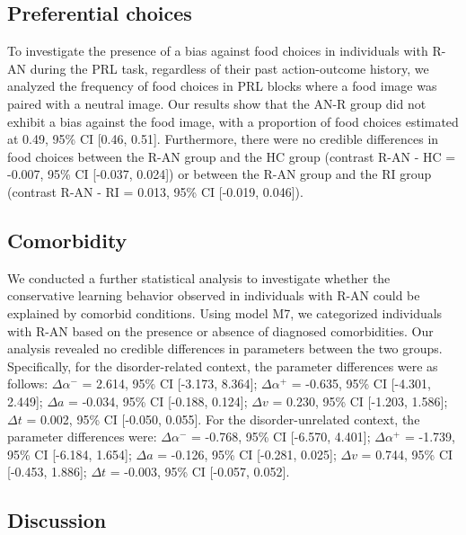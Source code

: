 \documentclass[
  man,floatsintext]{apa6}
\begin{document}
\hypertarget{preferential-choices}{%
\subsection{Preferential choices}\label{preferential-choices}}

To investigate the presence of a bias against food choices in individuals with R-AN during the PRL task, regardless of their past action-outcome history, we analyzed the frequency of food choices in PRL blocks where a food image was paired with a neutral image. Our results show that the AN-R group did not exhibit a bias against the food image, with a proportion of food choices estimated at 0.49, 95\% CI {[}0.46, 0.51{]}. Furthermore, there were no credible differences in food choices between the R-AN group and the HC group (contrast R-AN - HC = -0.007, 95\% CI {[}-0.037, 0.024{]}) or between the R-AN group and the RI group (contrast R-AN - RI = 0.013, 95\% CI {[}-0.019, 0.046{]}).

\hypertarget{comorbidity}{%
\subsection{Comorbidity}\label{comorbidity}}

We conducted a further statistical analysis to investigate whether the conservative learning behavior observed in individuals with R-AN could be explained by comorbid conditions. Using model M7, we categorized individuals with R-AN based on the presence or absence of diagnosed comorbidities. Our analysis revealed no credible differences in parameters between the two groups. Specifically, for the disorder-related context, the parameter differences were as follows: \(\Delta \alpha^-\) = 2.614, 95\% CI {[}-3.173, 8.364{]}; \(\Delta \alpha^+\) = -0.635, 95\% CI {[}-4.301, 2.449{]}; \(\Delta a\) = -0.034, 95\% CI {[}-0.188, 0.124{]}; \(\Delta v\) = 0.230, 95\% CI {[}-1.203, 1.586{]}; \(\Delta t\) = 0.002, 95\% CI {[}-0.050, 0.055{]}. For the disorder-unrelated context, the parameter differences were: \(\Delta \alpha^-\) = -0.768, 95\% CI {[}-6.570, 4.401{]}; \(\Delta \alpha^+\) = -1.739, 95\% CI {[}-6.184, 1.654{]}; \(\Delta a\) = -0.126, 95\% CI {[}-0.281, 0.025{]}; \(\Delta v\) = 0.744, 95\% CI {[}-0.453, 1.886{]}; \(\Delta t\) = -0.003, 95\% CI {[}-0.057, 0.052{]}.

\hypertarget{discussion}{%
\subsection{Discussion}\label{discussion}}
\end{document}
